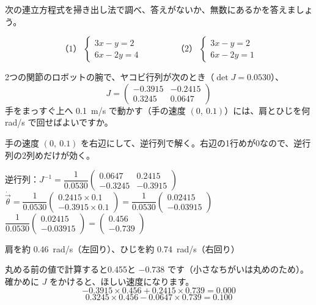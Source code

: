 \begin{jibun}
次の連立方程式を掃き出し法で調べ、答えがないか、無数にあるかを答えましょう。\par
\[ \text{（1）}\ \begin{cases}3x-y=2\\6x-2y=4\end{cases}\qquad\qquad \text{（2）}\ \begin{cases}3x-y=2\\6x-2y=1\end{cases} \]
\end{jibun}

\begin{reidai}[ロボットの関節の角速度]
2つの関節のロボットの腕で、ヤコビ行列が次のとき（$\det J=0.0530$）、
\[ J=\begin{pmatrix}-0.3915&-0.2415\\0.3245&0.0647\end{pmatrix} \]
手をまっすぐ上へ \qty{0.1}{m/s} で動かす（手の速度 $(0,\ 0.1)$）には、肩とひじを何 rad/s で回せばよいですか。\par
\kangaekata 手の速度 $(0,\ 0.1)$ を右辺にして、逆行列で解く。右辺の1行めが0なので、逆行列の2列めだけが効く。\par
\shiki 逆行列：$J^{-1}=\dfrac{1}{0.0530}\begin{pmatrix}0.0647&0.2415\\-0.3245&-0.3915\end{pmatrix}$\kviifq
$\dot{\vec\theta}=\dfrac{1}{0.0530}\begin{pmatrix}0.2415\times0.1\\-0.3915\times0.1\end{pmatrix}=\dfrac{1}{0.0530}\begin{pmatrix}0.02415\\-0.03915\end{pmatrix}$\kviifq
$\dfrac{1}{0.0530}\begin{pmatrix}0.02415\\-0.03915\end{pmatrix}=\begin{pmatrix}0.456\\-0.739\end{pmatrix}$\par
\kotae 肩を約 \qty{0.46}{rad/s}（左回り）、ひじを約 \qty{0.74}{rad/s}（右回り）
\end{reidai}
\noindent 丸める前の値で計算すると0.455と $-0.738$ です（小さなちがいは丸めのため）。確かめに $J$ をかけると、ほしい速度になります。
\[ -0.3915\times0.456+0.2415\times0.739=0.000 \]
\[ 0.3245\times0.456-0.0647\times0.739=0.100 \]


